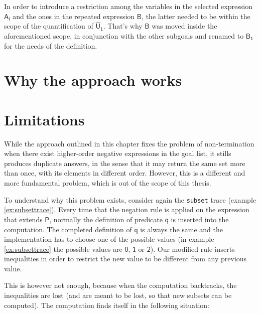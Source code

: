 \documentclass[inscr,ack,preface]{dithesis}
\theoremstyle{definition}
\newcommand{\msf}[1]{$\mathsf{#1}$}
\begin{document}
In order to introduce a restriction among the variables in the selected expression \msf{A_i} and the ones in the repeated expression \msf{B}, the latter needed to be within the scope of the quantification of \msf{\widehat{U}_1}. That's why \msf{B} was moved inside the aforementioned scope, in conjunction with the other subgoals and renamed to \msf{B_1} for the needs of the definition.


\section{Why the approach works}

\section{Limitations}
\label{section:limitations}
While the approach outlined in this chapter fixes the problem of non-termination when there exist higher-order negative expressions in the goal list, it stills produces duplicate answers, in the sense that it may return the same set more than once, with its elements in different order. However, this is a different and more fundamental problem, which is out of the scope of this thesis.

To understand why this problem exists, consider again the \texttt{subset} trace (example \ref{ex:subsettrace}). Every time that the negation rule is applied on the expression that extends \msf{P}, normally the definition of predicate \msf{q} is inserted into the computation. The completed definition of \msf{q} is always the same and the implementation has to choose one of the possible values (in example \ref{ex:subsettrace} the possible values are \msf{0}, \msf{1} or \msf{2}). Our modified rule inserts inequalities in order to restrict the new value to be different from any previous value.

This is however not enough, because when the computation backtracks, the inequalities are lost (and are meant to be lost, so that new subsets can be computed). The computation finds itself in the following situation:
\end{document}
